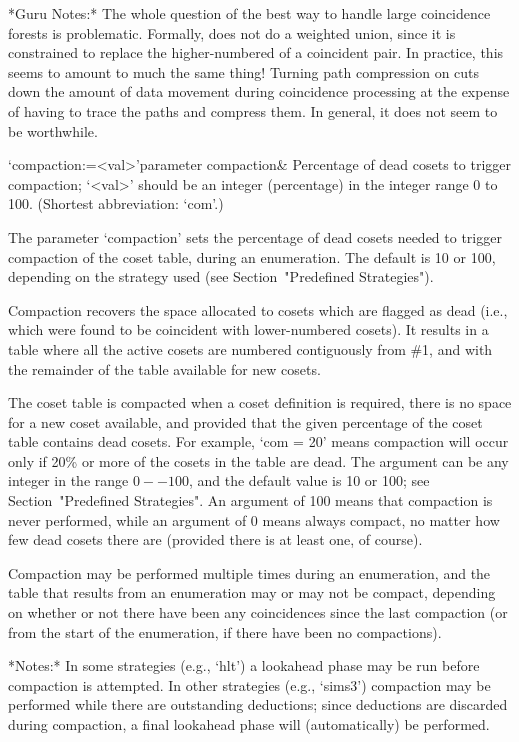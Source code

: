 *Guru Notes:*
The whole question of the best way to handle large coincidence forests
is problematic.  Formally, {\ACE} does  not do a weighted union, since
it is constrained to replace the higher-numbered of a coincident pair.
In practice,  this seems  to amount to  much the same  thing!  Turning
path  compression on  cuts down  the  amount of  data movement  during
coincidence processing at the expense of having to trace the paths and
compress them.  In general, it does not seem to be worthwhile.

\>`compaction:=<val>'{parameter compaction}&
Percentage of dead cosets to trigger compaction;
`<val>' should be an integer (percentage) in the integer range 0 to 100.
(Shortest abbreviation: `com'.)

The parameter `compaction' sets the percentage of dead cosets needed to
trigger compaction of the coset table, during an enumeration.  
The default is 10  or 100, depending on the strategy used
(see Section~"Predefined Strategies").

Compaction recovers the space allocated to cosets which are flagged as
dead  (i.e., which  were found  to be  coincident  with lower-numbered
cosets).   It results  in  a table  where  all the  active cosets  are
numbered contiguously  from \#1, and  with the remainder of  the table
available for new cosets.

The  coset table  is compacted  when a  coset definition  is required,
there is  no space for  a new coset  available, and provided  that the
given  percentage  of  the  coset  table contains  dead  cosets.   For
example, `com =  20' means compaction will occur only  if 20\% or more
of the cosets in the table  are dead.  The argument can be any integer
in  the range  $0--100$,  and the  default  value is  10  or 100;  see
Section~"Predefined  Strategies".   An  argument  of  100  means  that
compaction is  never performed,  while an argument  of 0  means always
compact, no matter how few dead cosets there are (provided there is at
least one, of course).

Compaction may be performed  multiple times during an enumeration, and
the table that results from an  enumeration may or may not be compact,
depending on whether or not there have been any coincidences since the
last compaction (or  from the start of the  enumeration, if there have
been no compactions).

*Notes:*
In some strategies  (e.g., `hlt') a lookahead phase  may be run before
compaction  is   attempted.   In  other   strategies  (e.g.,  `sims3')
compaction may  be performed  while there are  outstanding deductions;
since deductions  are discarded  during compaction, a  final lookahead
phase will (automatically) be performed.

